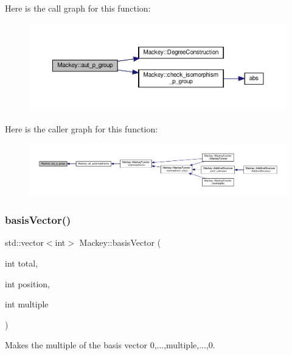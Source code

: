 Here is the call graph for this function\+:\nopagebreak
\begin{figure}[H]
\begin{center}
\leavevmode
\includegraphics[width=350pt]{namespaceMackey_ab3832e52497b387d4553af06aa26ec99_cgraph}
\end{center}
\end{figure}
Here is the caller graph for this function\+:\nopagebreak
\begin{figure}[H]
\begin{center}
\leavevmode
\includegraphics[width=350pt]{namespaceMackey_ab3832e52497b387d4553af06aa26ec99_icgraph}
\end{center}
\end{figure}
\mbox{\label{namespaceMackey_a86cc6cbaa708580f4e382b066bd0b7d4}} 
\subsubsection{\texorpdfstring{basis\+Vector()}{basisVector()}\hspace{0.1cm}{\footnotesize\ttfamily [1/2]}}
{\footnotesize\ttfamily std\+::vector$<$int$>$ Mackey\+::basis\+Vector (\begin{DoxyParamCaption}\item[{int}]{total,  }\item[{int}]{position,  }\item[{int}]{multiple }\end{DoxyParamCaption})\hspace{0.3cm}{\ttfamily [inline]}}



Makes the multiple of the basis vector 0,...,multiple,...,0. 

